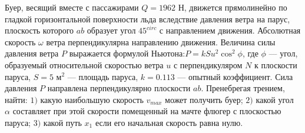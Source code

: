 Буер, весящий вместе с пассажирами $Q=1962$ Н, движется прямолинейно по
гладкой горизонтальной поверхности льда вследствие давления ветра
на парус, плоскость которого $ab$ образует угол $45^{circ}$ с
направлением движения. Абсолютная скорость $\omega$ ветра
перпендикулярна направлению движения. Величина силы давления ветра
$P$ выражается формулой Ньютона:$P=kSu^2\cos^2\phi$,
где $\phi$ --- угол, образуемый относительной скоростью ветра $u$ с
перпендикуляром $N$ к плоскости паруса, $S=5$ м$^2$ --- площадь
паруса, $k=0.113$ --- опытный коэффициент. Сила давления $P$ направлена
перпендикулярно плоскости $ab$. Пренебрегая трением, найти:
$1)$ какую наибольшую скорость $v_{max}$ может получить буер;
$2)$ какой угол $\alpha$ составляет при этой скорости помещенный на мачте
флюгер с плоскостью паруса;
$3)$ какой путь $x_{1}$ если его начальная скорость равна нулю.
